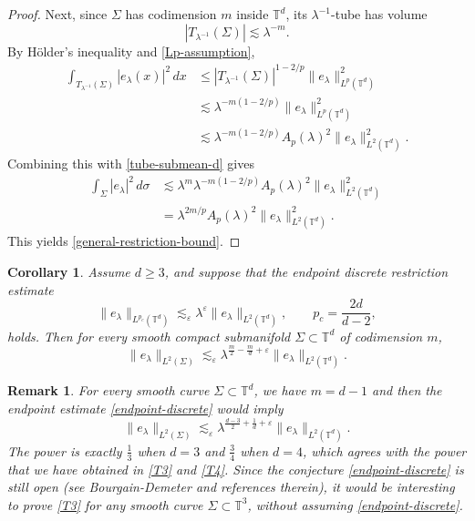 \documentclass[11pt,reqno]{amsart}
\newtheorem{corollary}[theorem]{Corollary}
\newtheorem{remark}[theorem]{Remark}
\numberwithin{equation}{section}
\newcommand{\1}{\textbf{1}}
\newcommand{\ls}{\lesssim}
\newcommand{\T}{\mathbb T}
\newcommand{\eps}{\varepsilon}
\begin{document}
\begin{proof}
		Next, since \(\Sigma\) has codimension $m$ inside \(\T^d\), its
		\(\lambda^{-1}\)-tube has volume
		\begin{equation}\label{tube-volume-d}
			|T_{\lambda^{-1}}(\Sigma)|
			\lesssim
			\lambda^{-m} .
		\end{equation}
		By H\"older's inequality and \eqref{Lp-assumption},
		\[
		\begin{aligned}
			\int_{T_{\lambda^{-1}}(\Sigma)}
			|e_\lambda(x)|^2\,dx
			&\le
			|T_{\lambda^{-1}}(\Sigma)|^{1-2/p}
			\|e_\lambda\|_{L^p(\T^d)}^2\\
			&\lesssim
			\lambda^{-m(1-2/p)}
			\|e_\lambda\|_{L^p(\T^d)}^2\\
			&\ls 	\lambda^{-m(1-2/p)}
			A_p(\lambda)^2
			\|e_\lambda\|_{L^2(\T^d)}^2 .
		\end{aligned}
		\]
		Combining this with \eqref{tube-submean-d} gives
		\[
		\begin{aligned}
			\int_\Sigma |e_\lambda|^2\,d\sigma
			&\lesssim
			\lambda^{m}
			\lambda^{-m(1-2/p)}
			A_p(\lambda)^2
			\|e_\lambda\|_{L^2(\T^d)}^2        \\
			&=
			\lambda^{2m/p}
			A_p(\lambda)^2
			\|e_\lambda\|_{L^2(\T^d)}^2 .
		\end{aligned}
		\]
		This yields
		\eqref{general-restriction-bound}.
	\end{proof}
	
	\begin{corollary}
		Assume \(d\ge3\), and suppose that the endpoint discrete restriction
		estimate
		\begin{equation}\label{endpoint-discrete}
			\|e_\lambda\|_{L^{p_c}(\T^d)}
			\lesssim_\eps
			\lambda^\eps
			\|e_\lambda\|_{L^2(\T^d)},
			\qquad
			p_c=\frac{2d}{d-2},
		\end{equation}
		holds.  Then for every smooth compact submanifold
		\(\Sigma\subset\T^d\) of codimension $m$,
		\begin{equation}\label{endpoint-corollary}
			\|e_\lambda\|_{L^2(\Sigma)}
			\lesssim_\eps
			\lambda^{\frac m2-\frac md+\eps}
			\|e_\lambda\|_{L^2(\T^d)} .
		\end{equation}
	\end{corollary}
	
	
	
	
	
	\begin{remark}\label{dcrem}
		For every smooth curve \(\Sigma\subset\T^d\), we have $m=d-1$ and then the endpoint  estimate \eqref{endpoint-discrete}
		would imply
		\begin{equation}\label{dcb}
			\|e_\lambda\|_{L^2(\Sigma)}
			\lesssim_{\eps}
			\lambda^{\frac{d-3}2+\frac1d+\eps}
			\|e_\lambda\|_{L^2(\T^d)}.
		\end{equation}
		The power is exactly $\frac13$ when $d=3$ and $\frac34$ when $d=4$, which agrees with the power that we have obtained in \eqref{T3} and \eqref{T4}. Since the conjecture \eqref{endpoint-discrete} is still open (see Bourgain-Demeter \cite[Conjecture 2.6]{BD} and references therein), it would be interesting to prove \eqref{T3} for any smooth curve \(\Sigma\subset\T^3\), without assuming \eqref{endpoint-discrete}.
	\end{remark}
	
\end{document}

